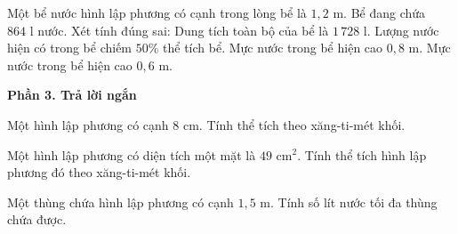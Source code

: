 \begin{ex} %
Một bể nước hình lập phương có cạnh trong lòng bể là $1{,}2\text{ m}$. Bể đang chứa $864\text{ l}$ nước. Xét tính đúng sai:
\choiceTF
{\True Dung tích toàn bộ của bể là $1\,728\text{ l}$.}
{\True Lượng nước hiện có trong bể chiếm $50\%$ thể tích bể.}
{Mực nước trong bể hiện cao $0{,}8\text{ m}$.}
{\True Mực nước trong bể hiện cao $0{,}6\text{ m}$.}
\end{ex}

\textbf{Phần 3. Trả lời ngắn}

\begin{ex} %
Một hình lập phương có cạnh $8\text{ cm}$. Tính thể tích theo xăng-ti-mét khối.
\end{ex}

\begin{ex} %
Một hình lập phương có diện tích một mặt là $49\text{ cm}^2$. Tính thể tích hình lập phương đó theo xăng-ti-mét khối.
\end{ex}

\begin{ex} %
Một thùng chứa hình lập phương có cạnh $1{,}5\text{ m}$. Tính số lít nước tối đa thùng chứa được.
\end{ex}

